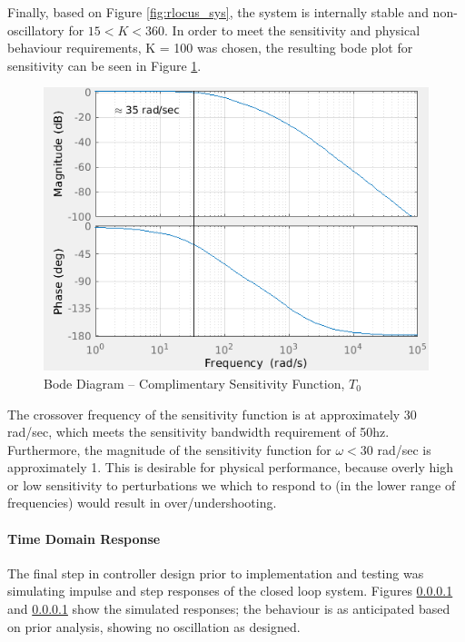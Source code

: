 \documentclass[11pt, a4paper,twocolumn]{article}
\begin{document}
			Finally, based on Figure \ref{fig:rlocus_sys}, the system is internally stable and non-oscillatory for $ 15 < K < 360 $. In order to meet the sensitivity and physical behaviour requirements, K = 100 was chosen, the resulting bode plot for sensitivity can be seen in Figure \ref{fig:bode_T}. 
			
			\begin{figure}[ht!]
			\centering
			\includegraphics[scale=0.4]{bode_T}
			\caption{Bode Diagram -- Complimentary Sensitivity Function, $ T_0 $}
			\label{fig:bode_T}
			\end{figure}
			
			The crossover frequency of the sensitivity function is at approximately 30 rad/sec, which meets the sensitivity bandwidth requirement of 50hz. Furthermore, the magnitude of the sensitivity function for $ \omega < 30 $ rad/sec is approximately 1. This is desirable for physical performance, because overly high or low sensitivity to perturbations we which to respond to (in the lower range of frequencies) would result in over/undershooting.
			
			
	\paragraph{		Time Domain Response		}
			The final step in controller design prior to implementation and testing was simulating impulse and step responses of the closed loop system. Figures \ref{} and \ref{} show the simulated responses; the behaviour is as anticipated based on prior analysis, showing no oscillation as designed.
	
\end{document}
